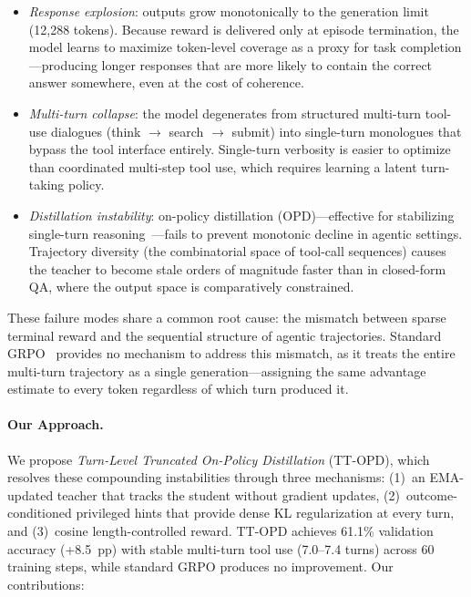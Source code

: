 \documentclass{article}
\begin{document}
\begin{itemize}[leftmargin=*,itemsep=2pt,topsep=2pt]
    \item \emph{Response explosion}: outputs grow monotonically to the generation limit (12,288 tokens). Because reward is delivered only at episode termination, the model learns to maximize token-level coverage as a proxy for task completion---producing longer responses that are more likely to contain the correct answer somewhere, even at the cost of coherence.

    \item \emph{Multi-turn collapse}: the model degenerates from structured multi-turn tool-use dialogues (think $\to$ search $\to$ submit) into single-turn monologues that bypass the tool interface entirely. Single-turn verbosity is easier to optimize than coordinated multi-step tool use, which requires learning a latent turn-taking policy.

    \item \emph{Distillation instability}: on-policy distillation (OPD)---effective for stabilizing single-turn reasoning~\citep{zhao26opsd, yang26rlsd}---fails to prevent monotonic decline in agentic settings. Trajectory diversity (the combinatorial space of tool-call sequences) causes the teacher to become stale orders of magnitude faster than in closed-form QA, where the output space is comparatively constrained.
\end{itemize}

These failure modes share a common root cause: the mismatch between sparse terminal reward and the sequential structure of agentic trajectories. Standard GRPO~\citep{shao2024deepseekmath} provides no mechanism to address this mismatch, as it treats the entire multi-turn trajectory as a single generation---assigning the same advantage estimate to every token regardless of which turn produced it.

\paragraph{Our Approach.}
We propose \emph{Turn-Level Truncated On-Policy Distillation} (TT-OPD), which resolves these compounding instabilities through three mechanisms: (1)~an EMA-updated teacher that tracks the student without gradient updates, (2)~outcome-conditioned privileged hints that provide dense KL regularization at every turn, and (3)~cosine length-controlled reward. TT-OPD achieves 61.1\% validation accuracy (+8.5~pp) with stable multi-turn tool use (7.0--7.4 turns) across 60 training steps, while standard GRPO produces no improvement. Our contributions:
\end{document}
